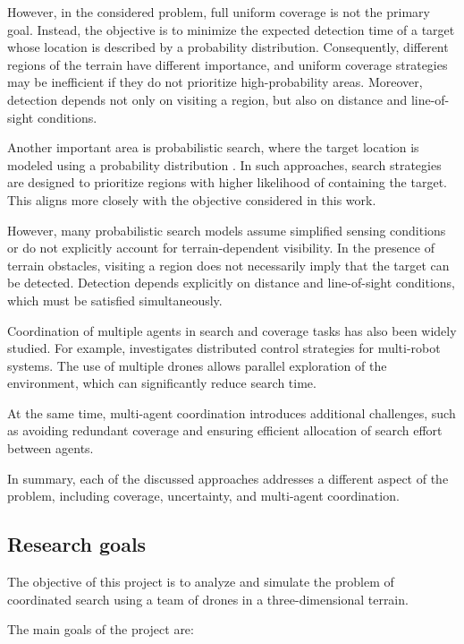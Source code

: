 \documentclass[english]{projectreport}
\begin{document}
However, in the considered problem, full uniform coverage is not the primary
goal. Instead, the objective is to minimize the expected detection time of
a target whose location is described by a probability distribution.
Consequently, different regions of the terrain have different importance,
and uniform coverage strategies may be inefficient if they do not prioritize
high-probability areas. Moreover, detection depends not only on visiting
a region, but also on distance and line-of-sight conditions.

Another important area is probabilistic search, where the target location is
modeled using a probability distribution \cite{stone1975search}. In such approaches, search
strategies are designed to prioritize regions with higher likelihood of
containing the target. This aligns more closely with the objective considered
in this work.

However, many probabilistic search models assume simplified sensing conditions
or do not explicitly account for terrain-dependent visibility. In the presence of terrain obstacles, visiting a region does not necessarily
imply that the target can be detected. Detection depends explicitly on
distance and line-of-sight conditions, which must be satisfied simultaneously.

Coordination of multiple agents in search and coverage tasks has also been
widely studied. For example, \cite{schwager2011distributed} investigates distributed control strategies
for multi-robot systems. The use of multiple drones allows parallel
exploration of the environment, which can significantly reduce search time.

At the same time, multi-agent coordination introduces additional challenges,
such as avoiding redundant coverage and ensuring efficient allocation of
search effort between agents.

In summary, each of the discussed approaches addresses a different aspect
of the problem, including coverage, uncertainty, and multi-agent coordination.

\subsection{Research goals}

The objective of this project is to analyze and simulate the problem of
coordinated search using a team of drones in a three-dimensional terrain.

The main goals of the project are:
\end{document}
